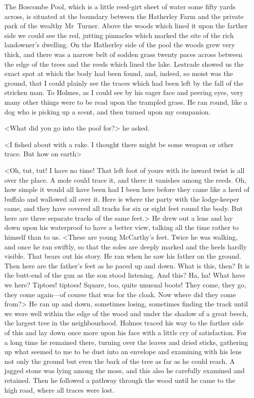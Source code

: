 The Boscombe Pool, which is a little reed-girt sheet of water some fifty yards across, is situated at the boundary between the Hatherley Farm and the private park of the wealthy Mr~Turner. Above the woods which lined it upon the farther side we could see the red, jutting pinnacles which marked the site of the rich landowner's dwelling. On the Hatherley side of the pool the woods grew very thick, and there was a narrow belt of sodden grass twenty paces across between the edge of the trees and the reeds which lined the lake. Lestrade showed us the exact spot at which the body had been found, and, indeed, so moist was the ground, that I could plainly see the traces which had been left by the fall of the stricken man. To Holmes, as I could see by his eager face and peering eyes, very many other things were to be read upon the trampled grass. He ran round, like a dog who is picking up a scent, and then turned upon my companion.

<What did you go into the pool for?> he asked.

<I fished about with a rake. I thought there might be some weapon or other trace. But how on earth\longdash>

<Oh, tut, tut! I have no time! That left foot of yours with its inward twist is all over the place. A mole could trace it, and there it vanishes among the reeds. Oh, how simple it would all have been had I been here before they came like a herd of buffalo and wallowed all over it. Here is where the party with the lodge-keeper came, and they have covered all tracks for six or eight feet round the body. But here are three separate tracks of the same feet.> He drew out a lens and lay down upon his waterproof to have a better view, talking all the time rather to himself than to us. <These are young McCarthy's feet. Twice he was walking, and once he ran swiftly, so that the soles are deeply marked and the heels hardly visible. That bears out his story. He ran when he saw his father on the ground. Then here are the father's feet as he paced up and down. What is this, then? It is the butt-end of the gun as the son stood listening. And this? Ha, ha! What have we here? Tiptoes! tiptoes! Square, too, quite unusual boots! They come, they go, they come again—of course that was for the cloak. Now where did they come from?> He ran up and down, sometimes losing, sometimes finding the track until we were well within the edge of the wood and under the shadow of a great beech, the largest tree in the neighbourhood. Holmes traced his way to the farther side of this and lay down once more upon his face with a little cry of satisfaction. For a long time he remained there, turning over the leaves and dried sticks, gathering up what seemed to me to be dust into an envelope and examining with his lens not only the ground but even the bark of the tree as far as he could reach. A jagged stone was lying among the moss, and this also he carefully examined and retained. Then he followed a pathway through the wood until he came to the high road, where all traces were lost.


